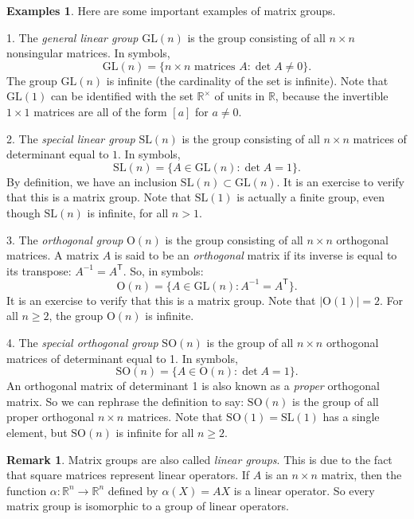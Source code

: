 \documentclass[11pt]{article}
\theoremstyle{definition}
\newtheorem{examples}[thm]{Examples}
\newtheorem{rmk}[thm]{Remark}
\newcommand{\R}{\mathbb{R}} %
\newcommand{\GL}{\mathrm{GL}}
\newcommand{\SL}{\mathrm{SL}}
\newcommand{\Orth}{\mathrm{O}}
\newcommand{\SO}{\mathrm{SO}}
\newcommand{\transpose}{\mathsf{T}}
\begin{document}
\begin{examples}
Here are some important examples of matrix groups. 

1. The \emph{general linear group}
$\GL(n)$\index{GL@$\GL(n)$} is the group consisting of all $n \times
n$ nonsingular matrices. In symbols,
\[
  \GL(n) = \{ n \times n \text{ matrices } A : \det A \ne 0\}.
\]
The group $\GL(n)$ is infinite (the cardinality of the set is
infinite). Note that $\GL(1)$ can be identified with the set
$\R^\times$ of units in $\R$, because the invertible $1 \times 1$
matrices are all of the form $[a]$ for $a \ne 0$.

2. The \emph{special linear group}
$\SL(n)$\index{SL@$\SL(n)$} is the group consisting of all $n \times
n$ matrices of determinant equal to $1$. In symbols,
\[
  \SL(n) = \{ A \in \GL(n) : \det A = 1 \}.
\]
By definition, we have an inclusion $\SL(n) \subset \GL(n)$. It is an
exercise to verify that this is a matrix group. Note that $\SL(1)$ is
actually a finite group, even though $\SL(n)$ is infinite, for all $n >
1$.

3. The \emph{orthogonal group}
$\Orth(n)$\index{O@$\Orth(n)$} is the group consisting of all $n
\times n$ orthogonal matrices. A matrix $A$ is said to be an
\emph{orthogonal} matrix if its inverse is
equal to its transpose: $A^{-1} = A^\transpose$. So, in symbols:
\[
  \Orth(n) = \{ A \in \GL(n) : A^{-1} = A^\transpose \}.
\]
It is an exercise to verify that this is a matrix group. Note that
$|\Orth(1)| = 2$. For all $n \ge 2$, the group $\Orth(n)$ is infinite.

4. The \emph{special orthogonal group}
$\SO(n)$\index{SO@$\SO(n)$} is the group of all $n \times n$
orthogonal matrices of determinant equal to 1. In symbols,
\[
  \SO(n) = \{ A \in \Orth(n) : \det A = 1 \}.
\]
An orthogonal matrix of determinant 1 is also known as a \emph{proper}
orthogonal matrix. So we can rephrase
the definition to say: $\SO(n)$ is the group of all proper orthogonal
$n \times n$ matrices. Note that $\SO(1) = \SL(1)$ has a single
element, but $\SO(n)$ is infinite for all $n \ge 2$.
\end{examples}

\begin{rmk}
  Matrix groups are also called \emph{linear groups}. This is due to
  the fact that square matrices represent linear operators. If $A$ is
  an $n \times n$ matrix, then the function $\alpha: \R^n \to \R^n$
  defined by $\alpha(X) = AX$ is a linear operator. So every matrix
  group is isomorphic to a group of linear operators.
\end{rmk}
\end{document}
